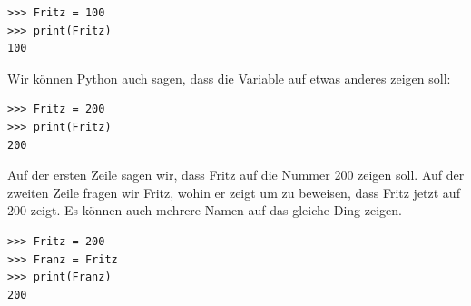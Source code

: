 \begin{Verbatim}[frame=single]
>>> Fritz = 100
>>> print(Fritz)
100
\end{Verbatim}
Wir können Python auch sagen, dass die Variable  auf etwas anderes zeigen soll:

\begin{Verbatim}[frame=single]
>>> Fritz = 200
>>> print(Fritz)
200
\end{Verbatim}

\noindent
Auf der ersten Zeile sagen wir, dass Fritz auf die Nummer 200 zeigen soll. Auf der zweiten Zeile fragen wir Fritz, wohin er zeigt um zu beweisen, dass Fritz jetzt auf 200 zeigt. Es können auch mehrere Namen auf das gleiche Ding zeigen.

\begin{Verbatim}[frame=single]
>>> Fritz = 200
>>> Franz = Fritz
>>> print(Franz)
200
\end{Verbatim}

